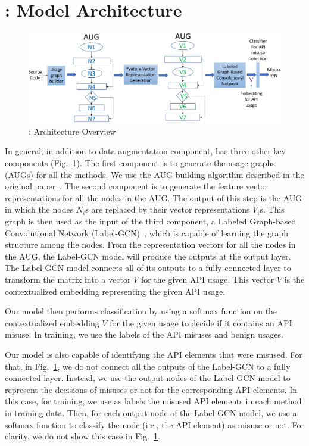\section{{\tool}: Model Architecture}
\label{sec:overview}

\begin{figure}[t]
\begin{center}
\includegraphics[width=5.6in]{overview.png}
\vspace{-5pt}
\caption{{\tool}: Architecture Overview}
\label{fig:overview}
\end{center}
\end{figure}

In general, in addition to data augmentation component, {\tool} has
three other key components (Fig.~\ref{fig:overview}). The first component is
to generate the usage graphs (AUGs) for all the methods. We use the
AUG building algorithm described in the original
paper~\cite{msr19}. The second component is to generate the feature
vector representations for all the nodes in the AUG. The output of
this step is the AUG in which the nodes $N_i$s are replaced by their
vector representations $V_i$s. This graph is then used as the input of
the third component, a Labeled Graph-based Convolutional Network
(Label-GCN)~\cite{label-gcn}, which is capable of learning the graph
structure among the nodes. From the representation vectors for all the
nodes in the AUG, the Label-GCN model will produce the outputs at the
output layer. The Label-GCN model connects all of its outputs to a
fully connected layer to transform the matrix into a vector $V$ for
the given API usage. This vector $V$ is the contextualized embedding
representing the given API usage.

Our model then performs classification by using a softmax function on
the contextualized embedding $V$ for the given usage to decide if it
contains an API misuse. In training, we use the labels of the API
misuses and benign usages.

Our model is also capable of identifying the API elements that were
misused. For that, in Fig.~\ref{fig:overview}, we do not connect all
the outputs of the Label-GCN to a fully connected layer. Instead, we
use the output nodes of the Label-GCN model to represent the decisions
of misuses or not for the corresponding API elements. In this case,
for training, we use as labels the misused API elements in each method
in training data. Then, for each output node of the Label-GCN model,
we use a softmax function to classify the node (i.e., the API element)
as misuse or not. For clarity, we do not show this case in
Fig.~\ref{fig:overview}.

